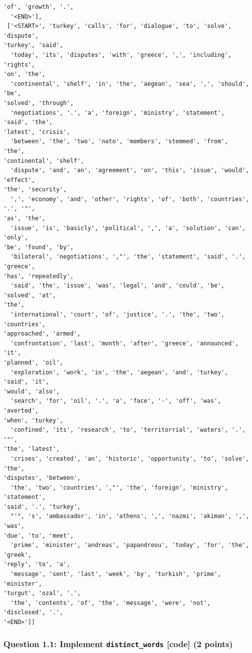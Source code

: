\documentclass[11pt]{article}
\begin{document}
\begin{Verbatim}[commandchars=\\\{\}]
'of', 'growth', '.',
  '<END>'],
 ['<START>', 'turkey', 'calls', 'for', 'dialogue', 'to', 'solve', 'dispute',
'turkey', 'said',
  'today', 'its', 'disputes', 'with', 'greece', ',', 'including', 'rights',
'on', 'the',
  'continental', 'shelf', 'in', 'the', 'aegean', 'sea', ',', 'should', 'be',
'solved', 'through',
  'negotiations', '.', 'a', 'foreign', 'ministry', 'statement', 'said', 'the',
'latest', 'crisis',
  'between', 'the', 'two', 'nato', 'members', 'stemmed', 'from', 'the',
'continental', 'shelf',
  'dispute', 'and', 'an', 'agreement', 'on', 'this', 'issue', 'would', 'effect',
'the', 'security',
  ',', 'economy', 'and', 'other', 'rights', 'of', 'both', 'countries', '.', '"',
'as', 'the',
  'issue', 'is', 'basicly', 'political', ',', 'a', 'solution', 'can', 'only',
'be', 'found', 'by',
  'bilateral', 'negotiations', ',"', 'the', 'statement', 'said', '.', 'greece',
'has', 'repeatedly',
  'said', 'the', 'issue', 'was', 'legal', 'and', 'could', 'be', 'solved', 'at',
'the',
  'international', 'court', 'of', 'justice', '.', 'the', 'two', 'countries',
'approached', 'armed',
  'confrontation', 'last', 'month', 'after', 'greece', 'announced', 'it',
'planned', 'oil',
  'exploration', 'work', 'in', 'the', 'aegean', 'and', 'turkey', 'said', 'it',
'would', 'also',
  'search', 'for', 'oil', '.', 'a', 'face', '-', 'off', 'was', 'averted',
'when', 'turkey',
  'confined', 'its', 'research', 'to', 'territorrial', 'waters', '.', '"',
'the', 'latest',
  'crises', 'created', 'an', 'historic', 'opportunity', 'to', 'solve', 'the',
'disputes', 'between',
  'the', 'two', 'countries', ',"', 'the', 'foreign', 'ministry', 'statement',
'said', '.', 'turkey',
  "'", 's', 'ambassador', 'in', 'athens', ',', 'nazmi', 'akiman', ',', 'was',
'due', 'to', 'meet',
  'prime', 'minister', 'andreas', 'papandreou', 'today', 'for', 'the', 'greek',
'reply', 'to', 'a',
  'message', 'sent', 'last', 'week', 'by', 'turkish', 'prime', 'minister',
'turgut', 'ozal', '.',
  'the', 'contents', 'of', 'the', 'message', 'were', 'not', 'disclosed', '.',
'<END>']]
    \end{Verbatim}

    \hypertarget{question-1.1-implement-distinct_words-code-2-points}{%
\subsubsection{\texorpdfstring{Question 1.1: Implement
\texttt{distinct\_words} {[}code{]} (2
points)}{Question 1.1: Implement distinct\_words {[}code{]} (2 points)}}\label{question-1.1-implement-distinct_words-code-2-points}}
\end{document}
